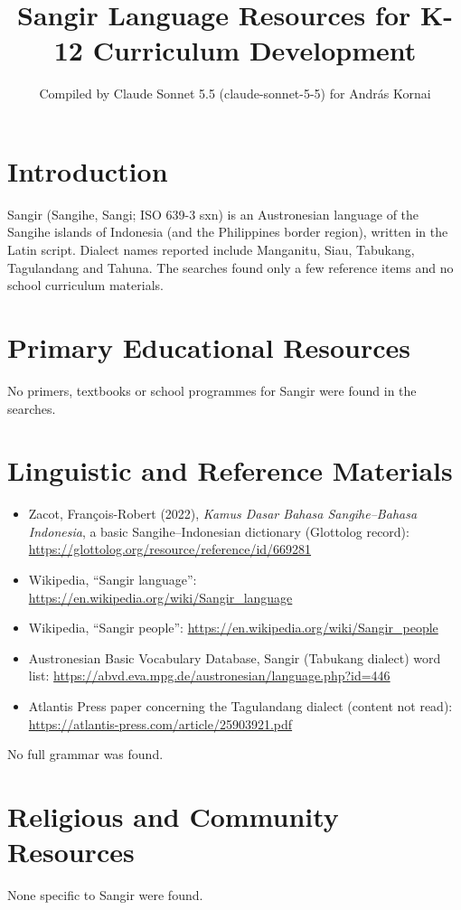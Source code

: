 \documentclass[12pt]{article}
\title{Sangir Language Resources for K-12 Curriculum Development}
\author{Compiled by Claude Sonnet 5.5 (claude-sonnet-5-5) for Andr\'as Kornai}
\date{}
\begin{document}
\maketitle

\section{Introduction}
Sangir (Sangihe, Sangi; ISO 639-3 sxn) is an Austronesian language of the Sangihe islands of Indonesia (and the Philippines border region), written in the Latin script. Dialect names reported include Manganitu, Siau, Tabukang, Tagulandang and Tahuna. The searches found only a few reference items and no school curriculum materials.

\section{Primary Educational Resources}
No primers, textbooks or school programmes for Sangir were found in the searches.

\section{Linguistic and Reference Materials}
\begin{itemize}
\item Zacot, Fran\c{c}ois-Robert (2022), \emph{Kamus Dasar Bahasa Sangihe--Bahasa Indonesia}, a basic Sangihe--Indonesian dictionary (Glottolog record): \url{https://glottolog.org/resource/reference/id/669281}
\item Wikipedia, ``Sangir language'': \url{https://en.wikipedia.org/wiki/Sangir_language}
\item Wikipedia, ``Sangir people'': \url{https://en.wikipedia.org/wiki/Sangir_people}
\item Austronesian Basic Vocabulary Database, Sangir (Tabukang dialect) word list: \url{https://abvd.eva.mpg.de/austronesian/language.php?id=446}
\item Atlantis Press paper concerning the Tagulandang dialect (content not read): \url{https://atlantis-press.com/article/25903921.pdf}
\end{itemize}
No full grammar was found.

\section{Religious and Community Resources}
None specific to Sangir were found.
\end{document}
